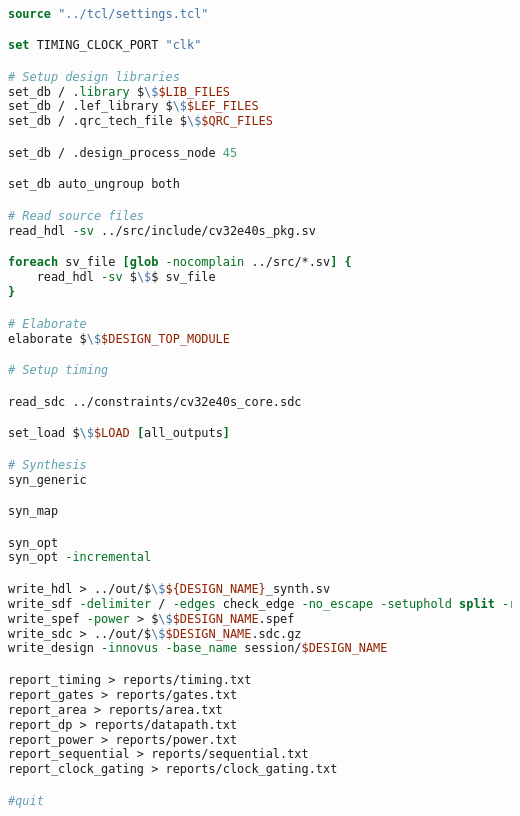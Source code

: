 \begin{lstlisting}[caption={TCL script for synthesizing designs and generating reports.}, label=lst:tcl, language=tcl]

source "../tcl/settings.tcl"

set TIMING_CLOCK_PORT "clk"

# Setup design libraries
set_db / .library $\$$LIB_FILES
set_db / .lef_library $\$$LEF_FILES
set_db / .qrc_tech_file $\$$QRC_FILES

set_db / .design_process_node 45

set_db auto_ungroup both

# Read source files
read_hdl -sv ../src/include/cv32e40s_pkg.sv

foreach sv_file [glob -nocomplain ../src/*.sv] {
	read_hdl -sv $\$$ sv_file
}

# Elaborate
elaborate $\$$DESIGN_TOP_MODULE

# Setup timing

read_sdc ../constraints/cv32e40s_core.sdc

set_load $\$$LOAD [all_outputs]

# Synthesis
syn_generic

syn_map

syn_opt
syn_opt -incremental

write_hdl > ../out/$\$${DESIGN_NAME}_synth.sv
write_sdf -delimiter / -edges check_edge -no_escape -setuphold split -recrem split > $\$$DESIGN_NAME.sdf.gz
write_spef -power > $\$$DESIGN_NAME.spef
write_sdc > ../out/$\$$DESIGN_NAME.sdc.gz
write_design -innovus -base_name session/$DESIGN_NAME

report_timing > reports/timing.txt
report_gates > reports/gates.txt
report_area > reports/area.txt
report_dp > reports/datapath.txt
report_power > reports/power.txt
report_sequential > reports/sequential.txt
report_clock_gating > reports/clock_gating.txt

#quit
\end{lstlisting}

